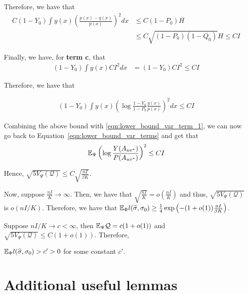 \documentclass{article}
\begin{document}
Therefore, we have that
\begin{align*}
C (1 - Y_0) \int y(x) \left( \frac{ p(x) - q(x)}{p(x)} \right)^2 dx &\leq 
        C ( 1 - P_0) H \\
   &\leq C \sqrt{ (1 - P_0)(1 - Q_0)} H \leq C I
\end{align*}


Finally, we have, for \textbf{term c}, that
\begin{align*}
(1 - Y_0) \int y(x) C I^2 dx &= (1 - Y_0) C I^2 \leq C I 
\end{align*}

Therefore, we have that 

\begin{align*}
(1 - Y_0) \int y(x) \left( \log \frac{1 - Y_0}{1 - P_0} \frac{y(x)}{p(x)} \right)^2 dx \leq C I 
\end{align*}

Combining the above bound with \ref{eqn:lower_bound_var_term_1}, we can now 
go back to Equation~\ref{eqn:lower_bound_var_terms} and get that
\begin{align*}
{\mathbb E}_{\Psi} \left( \log \frac{Y(A_{uv^*})}{P(A_{uv^*})} \right)^2 \leq C I 
\end{align*}

Hence, $\sqrt{5 V_{\Psi} (\mathcal{Q})} \leq C \sqrt{ \frac{n I}{\beta K}}$. 



Now, suppose $\frac{nI}{K} \rightarrow \infty$. Then, we have that $\sqrt{\frac{nI}{K}} = o \left( \frac{nI}{K} \right)$ and thus, $\sqrt{ 5 V_{\Psi}(\mathcal{Q})}$ is $o( n I/ K)$. Therefore, we have that ${\mathbb E}_{\Phi} l(\widehat{\sigma}, \sigma_0) \geq \frac{1}{4} \exp \left( - (1 + o(1)) \frac{nI}{\beta K} \right)$. 


Suppose $nI/K \rightarrow c < \infty$, then ${\mathbb E}_{\Psi} \mathcal{Q} = c (1 + o(1))$ and $\sqrt{ 5 V_{\Psi}(\mathcal{Q})} \leq C ( 1 + o(1))$. Therefore, 

 ${\mathbb E}_{\Phi} l(\widehat{\sigma}, \sigma_0) > c' > 0$ for some constant $c'$. 




\section{Additional useful lemmas}
\end{document}
